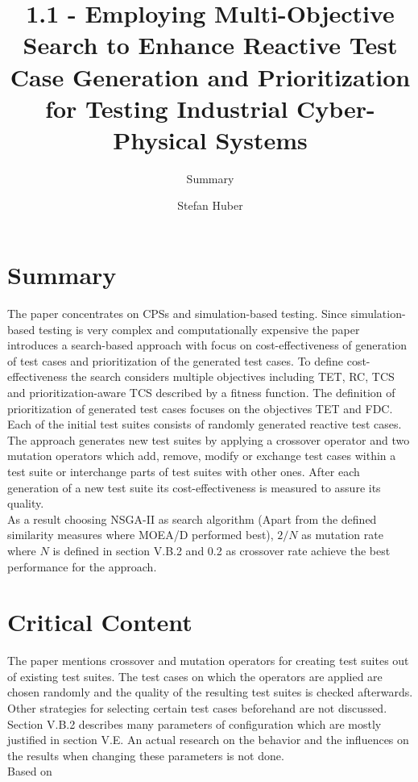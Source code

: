 \documentclass[oneside, notitlepage, twocolumn]{scrartcl}
\title{\LARGE 1.1 - Employing Multi-Objective Search to Enhance Reactive Test Case Generation and Prioritization for Testing Industrial Cyber-Physical Systems}
\subtitle{Summary}
\author{Stefan Huber}
\begin{document}
\maketitle

\section{Summary}
The paper concentrates on \ac{CPS}s and simulation-based testing.
Since simulation-based testing is very complex and computationally expensive the paper introduces a search-based approach with focus on cost-effectiveness of generation of test cases and prioritization of the generated test cases.
To define cost-effectiveness the search considers multiple objectives including \ac{TET}, \ac{RC}, \ac{TCS} and prioritization-aware \ac{TCS} described by a fitness function.
The definition of prioritization of generated test cases focuses on the objectives \ac{TET} and \ac{FDC}.\\
Each of the initial test suites consists of randomly generated reactive test cases.
The approach generates new test suites  by applying a crossover operator and two mutation operators which add, remove, modify or exchange test cases within a test suite or interchange parts of test suites with other ones.
After each generation of a new test suite its cost-effectiveness is measured to assure its quality.\\
As a result choosing \ac{NSGA-II} as search algorithm (Apart from the defined similarity measures where \ac{MOEA/D} performed best), \(2/N\) as mutation rate where \(N\) is defined in section V.B.2 and 0.2 as crossover rate achieve the best performance for the approach.

\section{Critical Content}
The paper mentions crossover and mutation operators for creating test suites out of existing test suites.
The test cases on which the operators are applied are chosen randomly and the quality of the resulting test suites is checked afterwards.
Other strategies for selecting certain test cases beforehand are not discussed.\\
Section V.B.2 describes many parameters of configuration which are mostly justified in section V.E.
An actual research on the behavior and the influences on the results when changing these parameters is not done.\\
Based on \cite{bringmann13}
\end{document}
